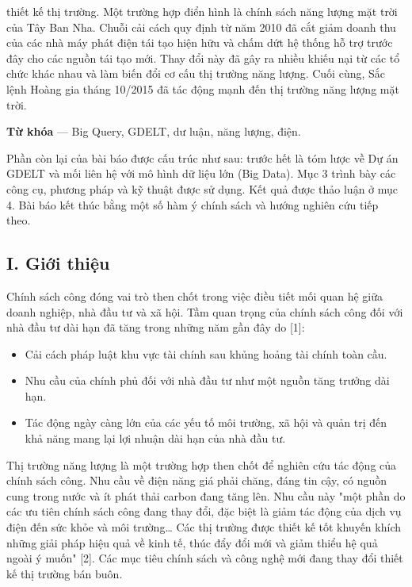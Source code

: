 thiết kế thị trường. Một trường hợp điển hình là chính sách năng lượng mặt trời của Tây Ban Nha. Chuỗi cải cách quy định từ năm 2010 đã cắt giảm doanh thu của các nhà máy phát điện tái tạo hiện hữu và chấm dứt hệ thống hỗ trợ trước đây cho các nguồn tái tạo mới. Thay đổi này đã gây ra nhiều khiếu nại từ các tổ chức khác nhau và làm biến đổi cơ cấu thị trường năng lượng. Cuối cùng, Sắc lệnh Hoàng gia tháng 10/2015 đã tác động mạnh đến thị trường năng lượng mặt trời.

\textbf{Từ khóa} --- Big Query, GDELT, dư luận, năng lượng, điện.

Phần còn lại của bài báo được cấu trúc như sau: trước hết là tóm lược về Dự án GDELT và mối liên hệ với mô hình dữ liệu lớn (Big Data). Mục 3 trình bày các công cụ, phương pháp và kỹ thuật được sử dụng. Kết quả được thảo luận ở mục 4. Bài báo kết thúc bằng một số hàm ý chính sách và hướng nghiên cứu tiếp theo.

\subsection{I. Giới thiệu}

Chính sách công đóng vai trò then chốt trong việc điều tiết mối quan hệ giữa doanh nghiệp, nhà đầu tư và xã hội. Tầm quan trọng của chính sách công đối với nhà đầu tư dài hạn đã tăng trong những năm gần đây do {[}1{]}:

\begin{itemize}
\item
  Cải cách pháp luật khu vực tài chính sau khủng hoảng tài chính toàn cầu.
\item
  Nhu cầu của chính phủ đối với nhà đầu tư như một nguồn tăng trưởng dài hạn.
\item
  Tác động ngày càng lớn của các yếu tố môi trường, xã hội và quản trị đến khả năng mang lại lợi nhuận dài hạn của nhà đầu tư.
\end{itemize}

Thị trường năng lượng là một trường hợp then chốt để nghiên cứu tác động của chính sách công. Nhu cầu về điện năng giá phải chăng, đáng tin cậy, có nguồn cung trong nước và ít phát thải carbon đang tăng lên. Nhu cầu này "một phần do các ưu tiên chính sách công đang thay đổi, đặc biệt là giảm tác động của dịch vụ điện đến sức khỏe và môi trường\ldots{} Các thị trường được thiết kế tốt khuyến khích những giải pháp hiệu quả về kinh tế, thúc đẩy đổi mới và giảm thiểu hệ quả ngoài ý muốn" {[}2{]}. Các mục tiêu chính sách và công nghệ mới đang thay đổi thiết kế thị trường bán buôn.

